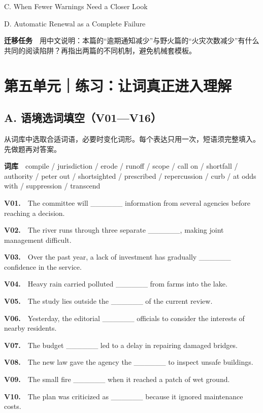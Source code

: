 \documentclass[a4paper,11pt,openany]{report}
\begin{document}
C. When Fewer Warnings Need a Closer Look

D. Automatic Renewal as a Complete Failure

\textbf{迁移任务}　用中文说明：本篇的``逾期通知减少''与野火篇的``火灾次数减少''有什么共同的阅读陷阱？再指出两篇的不同机制，避免机械套模板。

\chapter{第五单元｜练习：让词真正进入理解}\label{ux7b2cux4e94ux5355ux5143ux7ec3ux4e60ux8ba9ux8bcdux771fux6b63ux8fdbux5165ux7406ux89e3}

\section{A. 语境选词填空（V01---V16）}\label{a.-ux8bedux5883ux9009ux8bcdux586bux7a7av01v16}

从词库中选取合适词语，必要时变化词形。每个表达只用一次，短语须完整填入。先做题再对答案。

\textbf{词库}　compile / jurisdiction / erode / runoff / scope / call on / shortfall / authority / peter out / shortsighted / prescribed / repercussion / curb / at odds with / suppression / transcend

\textbf{V01.}　The committee will \_\_\_\_\_\_ information from several agencies before reaching a decision.

\textbf{V02.}　The river runs through three separate \_\_\_\_\_\_, making joint management difficult.

\textbf{V03.}　Over the past year, a lack of investment has gradually \_\_\_\_\_\_ confidence in the service.

\textbf{V04.}　Heavy rain carried polluted \_\_\_\_\_\_ from farms into the lake.

\textbf{V05.}　The study lies outside the \_\_\_\_\_\_ of the current review.

\textbf{V06.}　Yesterday, the editorial \_\_\_\_\_\_ officials to consider the interests of nearby residents.

\textbf{V07.}　The budget \_\_\_\_\_\_ led to a delay in repairing damaged bridges.

\textbf{V08.}　The new law gave the agency the \_\_\_\_\_\_ to inspect unsafe buildings.

\textbf{V09.}　The small fire \_\_\_\_\_\_ when it reached a patch of wet ground.

\textbf{V10.}　The plan was criticized as \_\_\_\_\_\_ because it ignored maintenance costs.
\end{document}
